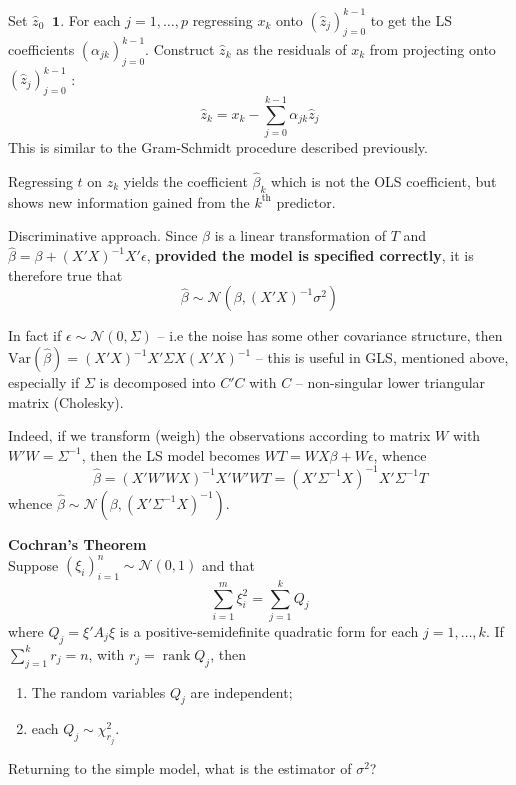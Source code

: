 \documentclass[a4paper]{article}
\newcommand{\brac}[1]{{\left ( #1 \right )}}
\newcommand{\Ncal}{\mathcal{N}}
\newcommand{\Var}[0]{{\text{Var}}}
\newcommand{\one}{\mathbf{1}}
\newcommand{\rank}{\mathop{\text{rank}}\nolimits}
\newcommand{\defn}{\mathop{\overset{\Delta}{=}}\nolimits}
\begin{document}

Set $\hat{z}_0 \defn \one$. For each $j=1,\ldots,p$ regressing $x_k$ onto
$\brac{\hat{z}_j}_{j=0}^{k-1}$ to get the LS coefficients $\brac{\alpha_{jk}}_{j=0}^{k-1}$.
Construct $\hat{z}_k$ as the residuals of $x_k$ from projecting onto $\brac{\hat{z}_j}_{j=0}^{k-1}$ :
\[\hat{z}_k = x_k - \sum_{j=0}^{k-1} \alpha_{jk} \hat{z}_j\]
This is similar to the Gram-Schmidt procedure described previously.

Regressing $t$ on $z_k$ yields the coefficient $\hat{\beta}_k$ which is not the
OLS coefficient, but shows new information gained from the $k^\text{th}$ predictor.

Discriminative approach.
Since $\hat{\beta}$ is a linear transformation of $T$ and $\hat{\beta} = \beta + \brac{X'X}^{-1}X'\epsilon$,
\textbf{provided the model is specified correctly}, it is therefore true that
\[\hat{\beta}\sim\Ncal\brac{\beta,\brac{X'X}^{-1} \sigma^2}\]

In fact if $\epsilon\sim \Ncal\brac{0,\Sigma}$ -- i.e the noise has some other
covariance structure, then $\Var(\hat{\beta}) = \brac{X'X}^{-1}X'\Sigma X\brac{X'X}^{-1}$
-- this is useful in GLS, mentioned above, especially if $\Sigma$ is decomposed
into $C'C$ with $C$ -- non-singular lower triangular matrix (Cholesky).

Indeed, if we transform (weigh) the observations according to matrix $W$ with $W'W = \Sigma^{-1}$, then the LS model becomes $WT=WX\beta + W\epsilon$, whence
\[\hat{\beta} = \brac{X'W'WX}^{-1}X'W'WT = \brac{X'\Sigma^{-1}X}^{-1}X'\Sigma^{-1}T\]
whence $\hat{\beta}\sim\Ncal\brac{\beta, \brac{X'\Sigma^{-1}X}^{-1}}$.

\noindent\textbf{Cochran's Theorem} \hfill\\
Suppose $\brac{\xi_i}_{i=1}^n \sim\Ncal(0, 1)$ and that
\[\sum_{i=1}^m \xi_i^2 = \sum_{j=1}^k Q_j\]
where $Q_j = \xi' A_j \xi$ is a positive-semidefinite quadratic form for each $j=1,\ldots,k$.
If $\sum_{j=1}^k r_j = n$, with $r_j = \rank{Q_j}$, then \begin{enumerate}
	\item The random variables $Q_j$ are independent;
	\item each $Q_j\sim \chi^2_{r_j}$.
\end{enumerate}

Returning to the simple model, what is the estimator of $\sigma^2$?
\end{document}
